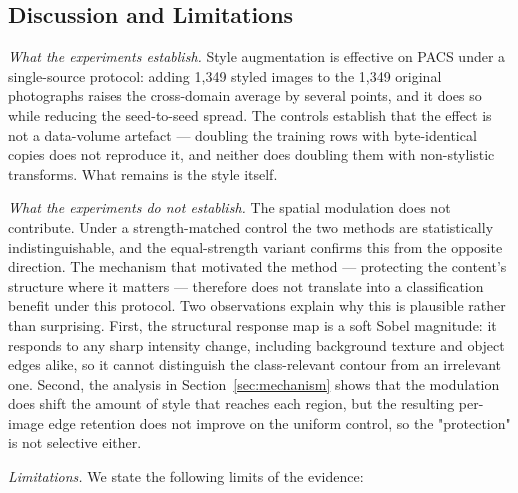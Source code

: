 \subsection{Discussion and Limitations}
\label{sec:limitations}

\textit{What the experiments establish.} Style augmentation is effective on PACS under a single-source protocol: adding 1{,}349 styled images to the 1{,}349 original photographs raises the cross-domain average by several points, and it does so while reducing the seed-to-seed spread. The controls establish that the effect is not a data-volume artefact --- doubling the training rows with byte-identical copies does not reproduce it, and neither does doubling them with non-stylistic transforms. What remains is the style itself.

\textit{What the experiments do not establish.} The spatial modulation does not contribute. Under a strength-matched control the two methods are statistically indistinguishable, and the equal-strength variant confirms this from the opposite direction. The mechanism that motivated the method --- protecting the content's structure where it matters --- therefore does not translate into a classification benefit under this protocol. Two observations explain why this is plausible rather than surprising. First, the structural response map is a soft Sobel magnitude: it responds to any sharp intensity change, including background texture and object edges alike, so it cannot distinguish the class-relevant contour from an irrelevant one. Second, the analysis in Section~\ref{sec:mechanism} shows that the modulation does shift the amount of style that reaches each region, but the resulting per-image edge retention does not improve on the uniform control, so the "protection" is not selective either.

\textit{Limitations.} We state the following limits of the evidence:

